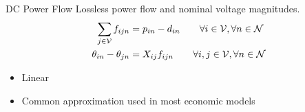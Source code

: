 \begin{frame}{DC Power Flow}
Lossless power flow and nominal voltage magnitudes.
\begin{align*}	\displaystyle
\sum_{j \in \cV}{f_{ijn}} &= p_{in} -d_{in} \hspace{20px}   \forall i \in \cV, \forall n \in \cN   
\\
\theta_{in} - \theta_{jn} &= X_{ij} f_{ijn}			\hspace{20px}	\forall i,j \in \cV, \forall n \in \cN   
\end{align*}

\begin{itemize}
\item Linear
\item Common approximation used in most economic models
\end{itemize}
\end{frame}

